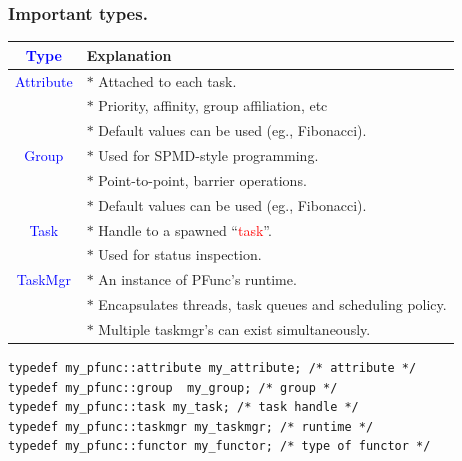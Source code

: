 \documentclass{beamer}
\newcommand{\tablefont}{\fontsize{8}{13}\selectfont}
\begin{document}
\begin{frame}[fragile]
\frametitle{Important types.}
\begin{center}
\tablefont
\begin{tabular}{|c|l|}
\hline
\textcolor{blue}{Type} & Explanation \\
\hline
\textcolor{blue}{Attribute} & $\ast{}$ Attached to each task. \\
          & $\ast{}$ Priority, affinity, group affiliation, etc \\
          & $\ast{}$ Default values can be used (eg., Fibonacci). \\
\hline
\textcolor{blue}{Group} & $\ast{}$ Used for SPMD-style programming. \\
      & $\ast{}$ Point-to-point, barrier operations. \\
      & $\ast{}$ Default values can be used (eg., Fibonacci). \\
\hline
\textcolor{blue}{Task} & $\ast{}$ Handle to a spawned ``\textcolor{red}{task}''. \\
     & $\ast{}$ Used for status inspection. \\
\hline
\textcolor{blue}{TaskMgr} & $\ast{}$ An instance of PFunc's runtime. \\
        & $\ast{}$ Encapsulates threads, task queues and scheduling policy. \\
        & $\ast{}$ Multiple taskmgr's can exist simultaneously. \\
\hline
\end{tabular}
\end{center}

\normalsize

\begin{center}
\begin{minipage}{0.5\textwidth}
\begin{lstlisting}
typedef my_pfunc::attribute my_attribute; /* attribute */
typedef my_pfunc::group  my_group; /* group */
typedef my_pfunc::task my_task; /* task handle */
typedef my_pfunc::taskmgr my_taskmgr; /* runtime */
typedef my_pfunc::functor my_functor; /* type of functor */
\end{lstlisting}
\end{minipage}
\end{center}

\end{frame}
\end{document}
